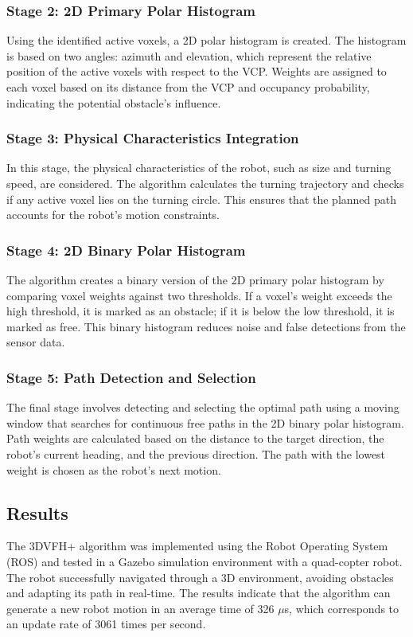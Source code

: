 \documentclass[a4paper,12pt]{article}
\begin{document}
\subsubsection{Stage 2: 2D Primary Polar Histogram}
Using the identified active voxels, a 2D polar histogram is created. The histogram is based on two angles: azimuth and elevation, which represent the relative position of the active voxels with respect to the VCP. Weights are assigned to each voxel based on its distance from the VCP and occupancy probability, indicating the potential obstacle's influence.

\subsubsection{Stage 3: Physical Characteristics Integration}
In this stage, the physical characteristics of the robot, such as size and turning speed, are considered. The algorithm calculates the turning trajectory and checks if any active voxel lies on the turning circle. This ensures that the planned path accounts for the robot's motion constraints.

\subsubsection{Stage 4: 2D Binary Polar Histogram}
The algorithm creates a binary version of the 2D primary polar histogram by comparing voxel weights against two thresholds. If a voxel’s weight exceeds the high threshold, it is marked as an obstacle; if it is below the low threshold, it is marked as free. This binary histogram reduces noise and false detections from the sensor data.

\subsubsection{Stage 5: Path Detection and Selection}
The final stage involves detecting and selecting the optimal path using a moving window that searches for continuous free paths in the 2D binary polar histogram. Path weights are calculated based on the distance to the target direction, the robot’s current heading, and the previous direction. The path with the lowest weight is chosen as the robot's next motion.

\subsection{Results}
The 3DVFH+ algorithm was implemented using the Robot Operating System (ROS) and tested in a Gazebo simulation environment with a quad-copter robot. The robot successfully navigated through a 3D environment, avoiding obstacles and adapting its path in real-time. The results indicate that the algorithm can generate a new robot motion in an average time of 326 $\mu$s, which corresponds to an update rate of 3061 times per second.
\end{document}
